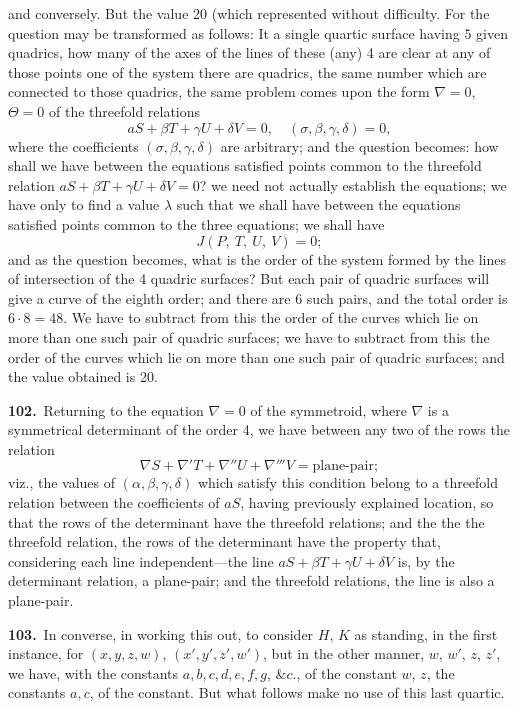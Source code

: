 \documentclass[11pt,a4paper]{article}
\begin{document}
\noindent and conversely. But the value 20 (which represented without difficulty. For the question may be transformed as follows: It a single quartic surface having $5$ given quadrics, how many of the axes of the lines of these (any) 4 are clear at any of those points one of the system there are quadrics, the same number which are connected to those quadrics, the same problem comes upon the form $\nabla = 0$, $\Theta = 0$ of the threefold relations
\[
aS + \beta T + \gamma U + \delta V = 0,\quad (\sigma,\beta,\gamma,\delta) = 0,
\]
where the coefficients $(\sigma,\beta,\gamma,\delta)$ are arbitrary; and the question becomes:
how shall we have between the equations satisfied points common to the threefold relation $aS + \beta T + \gamma U + \delta V = 0$? we need not actually establish the equations; we have only to find a value $\lambda$ such that we shall have between the equations satisfied points common to the three equations; we shall have
\[
J(P,\ T,\ U,\ V) = 0;
\]
and as the question becomes, what is the order of the system formed by the lines of intersection of the 4 quadric surfaces? But each pair of quadric surfaces will give a curve of the eighth order; and there are 6 such pairs, and the total order is $6 \cdot 8 = 48$. We have to subtract from this the order of the curves which lie on more than one such pair of quadric surfaces; we have to subtract from this the order of the curves which lie on more than one such pair of quadric surfaces; and the value obtained is 20.

\medskip

\textbf{102.}\ Returning to the equation $\nabla = 0$ of the symmetroid, where $\nabla$ is a symmetrical determinant of the order 4, we have between any two of the rows the relation
\[
\nabla S + \nabla' T + \nabla'' U + \nabla''' V = \text{plane-pair};
\]
viz., the values of $(\alpha, \beta, \gamma, \delta)$ which satisfy this condition belong to a threefold relation between the coefficients of $aS$, having previously explained location, so that the rows of the determinant have the threefold relations; and the the the threefold relation, the rows of the determinant have the property that, considering each line independent—the line $aS + \beta T + \gamma U + \delta V$ is, by the determinant relation, a plane-pair; and the threefold relations, the line is also a plane-pair.

\newpage
\setcounter{page}{174}

\noindent\textbf{103.}\ In converse, in working this out, to consider $H$, $K$ as standing, in the first instance, for $(x, y, z, w)$, $(x', y', z', w')$, but in the other manner, $w$, $w'$, $z$, $z'$, we have, with the constants $a, b, c, d, e, f, g$, $\&c.$, of the constant $w$, $z$, the constants $a, c$, of the constant. But what follows make no use of this last quartic.
\end{document}
